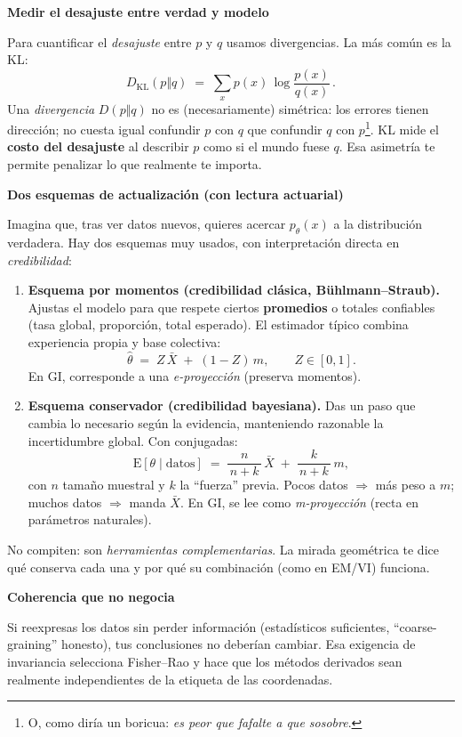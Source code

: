 \textbf{Medir el desajuste entre verdad y modelo}

Para cuantificar el \emph{desajuste} entre $p$ y $q$ usamos divergencias. La más común es la KL:
\[
D_{\mathrm{KL}}(p\Vert q)\;=\;\sum_x p(x)\,\log\frac{p(x)}{q(x)}\,.
\]
Una \emph{divergencia} $D(p\Vert q)$ no es (necesariamente) simétrica: los errores tienen dirección; no cuesta igual confundir $p$ con $q$ que confundir $q$ con $p$\footnote{O, como diría un boricua: \emph{es peor que fafalte a que sosobre}.}. KL mide el \textbf{costo del desajuste} al describir $p$ como si el mundo fuese $q$. Esa asimetría te permite penalizar lo que realmente te importa.

\textbf{Dos esquemas de actualización (con lectura actuarial)}

Imagina que, tras ver datos nuevos, quieres acercar $p_\theta(x)$ a la distribución verdadera. Hay dos esquemas muy usados, con interpretación directa en \emph{credibilidad}:

\begin{enumerate}
	\item \textbf{Esquema por momentos (credibilidad clásica, B{\"u}hlmann--Straub).}
	Ajustas el modelo para que respete ciertos \textbf{promedios} o totales confiables (tasa global, proporción, total esperado). El estimador típico combina experiencia propia y base colectiva:
	\[
	\hat{\theta}\;=\;Z\,\bar{X}\;+\;(1-Z)\,m,\qquad Z\in[0,1].
	\]
	En GI, corresponde a una \emph{e-proyección} (preserva momentos).
	
	\item \textbf{Esquema conservador (credibilidad bayesiana).}
	Das un paso que cambia lo necesario según la evidencia, manteniendo razonable la incertidumbre global. Con conjugadas:
	\[
	\mathrm{E}[\theta\mid \mathrm{datos}]\;=\;\frac{n}{\,n+k\,}\,\bar{X}\;+\;\frac{k}{\,n+k\,}\,m,
	\]
	con $n$ tamaño muestral y $k$ la “fuerza” previa. Pocos datos $\Rightarrow$ más peso a $m$; muchos datos $\Rightarrow$ manda $\bar{X}$. En GI, se lee como \emph{m-proyección} (recta en parámetros naturales).
\end{enumerate}

No compiten: son \emph{herramientas complementarias}. La mirada geométrica te dice qué conserva cada una y por qué su combinación (como en EM/VI) funciona.

\textbf{Coherencia que no negocia}

Si reexpresas los datos sin perder información (estadísticos suficientes, “coarse-graining” honesto), tus conclusiones no deberían cambiar. Esa exigencia de invariancia selecciona Fisher--Rao y hace que los métodos derivados sean realmente independientes de la etiqueta de las coordenadas.

